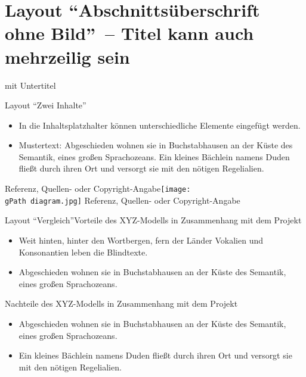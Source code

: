 \documentclass[hyperref={pdfpagelabels=false}, aspectratio=43, t]{beamer}  %
\newcommand{\gPath}{figures/}									%
\begin{document}
\section{Layout ``Abschnittsüberschrift ohne Bild''~-- Titel kann auch mehrzeilig sein}

\begin{sectionFrame}{}{mit Untertitel}
\end{sectionFrame}


\begin{textFrame2}{Layout ``Zwei Inhalte''}{}{
		\begin{itemize}
			\item In die Inhaltsplatzhalter können unterschiedliche Elemente eingefügt werden.
			\item Mustertext: Abgeschieden wohnen sie in Buchstabhausen an der Küste des Semantik, eines großen Sprachozeans. 
					Ein kleines Bächlein namens Duden fließt durch ihren Ort und versorgt sie mit den nötigen Regelialien.
		\end{itemize}
}{Referenz, Quellen- oder Copyright-Angabe}{}{\texttt{[image: \\gPath diagram.jpg]}}%
{Referenz, Quellen- oder Copyright-Angabe}
\end{textFrame2}

\begin{textFrame2}{Layout ``Vergleich''}{Vorteile des XYZ-Modells in Zusammenhang mit dem Projekt}%
{
		\begin{itemize}
			\item Weit hinten, hinter den Wortbergen, fern der Länder Vokalien und Konsonantien leben die Blindtexte.
			\item Abgeschieden wohnen sie in Buchstabhausen an der Küste des Semantik, eines großen Sprachozeans. 
		\end{itemize}
}{}{Nachteile des XYZ-Modells in Zusammenhang mit dem Projekt}{
		\begin{itemize}
			\item Abgeschieden wohnen sie in Buchstabhausen an der Küste des Semantik, eines großen Sprachozeans.
			\item Ein kleines Bächlein namens Duden fließt durch ihren Ort und versorgt sie mit den nötigen Regelialien. 
		\end{itemize}
}{}
\end{textFrame2}
\end{document}
